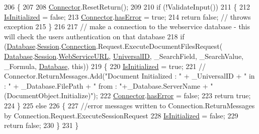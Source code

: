 \begin{DoxyCode}
206     \{
207 
208         \mbox{\hyperlink{class_connector}{Connector}}.ResetReturn();
209 
210         \textcolor{keywordflow}{if} (!ValidateInput())
211         \{
212             \mbox{\hyperlink{class_document_object_a3b2075b73f38d05091b69decc6ce7992}{IsInitialized}} = \textcolor{keyword}{false};
213             \mbox{\hyperlink{class_connector}{Connector}}.\mbox{\hyperlink{class_connector_a079bae21a5417efa53bfe8954c0f533f}{hasError}} = \textcolor{keyword}{true};
214             \textcolor{keywordflow}{return} \textcolor{keyword}{false};   \textcolor{comment}{// throws exception}
215         \}
216 
217         \textcolor{comment}{// make a connection to the webservice database - this will check the users authentication on that
       database}
218         \textcolor{keywordflow}{if} (\mbox{\hyperlink{class_document_object_a69d5338c9835f748490323d2950eed09}{Database}}.\mbox{\hyperlink{class_database_object_aa8484162b7d2a7c4c9426bca13c64c07}{Session}}.\mbox{\hyperlink{class_session_object_a014bdbf705a753540e19bfb53030c55c}{Connection}}.Request.ExecuteDocumentFilesRequest(
      \mbox{\hyperlink{class_document_object_a69d5338c9835f748490323d2950eed09}{Database}}.\mbox{\hyperlink{class_database_object_aa8484162b7d2a7c4c9426bca13c64c07}{Session}}.\mbox{\hyperlink{class_session_object_a697c071c812fbf7ad1166b896fb44c16}{WebServiceURL}}, \mbox{\hyperlink{class_document_object_a8b96d04632a2802e7cc5466ca5cee8cf}{UniversalID}}, \_SearchField, 
      \_SearchValue, \_Formula, \mbox{\hyperlink{class_document_object_a69d5338c9835f748490323d2950eed09}{Database}}, \textcolor{keyword}{this}))
219         \{
220             \mbox{\hyperlink{class_document_object_a3b2075b73f38d05091b69decc6ce7992}{IsInitialized}} = \textcolor{keyword}{true};
221             \textcolor{comment}{//  Connector.ReturnMessages.Add("Document Initialized : " + \_UniversalID + " in : " +
       \_Database.FilePath + " from : "+\_Database.ServerName + " (DocumentObject.Initialize)");}
222             \mbox{\hyperlink{class_connector}{Connector}}.\mbox{\hyperlink{class_connector_a079bae21a5417efa53bfe8954c0f533f}{hasError}} = \textcolor{keyword}{false};
223             \textcolor{keywordflow}{return} \textcolor{keyword}{true};
224         \}
225         \textcolor{keywordflow}{else}
226         \{
227             \textcolor{comment}{//error messages written to Connection.ReturnMessages by
       Connection.Request.ExecuteSessionRequest}
228             \mbox{\hyperlink{class_document_object_a3b2075b73f38d05091b69decc6ce7992}{IsInitialized}} = \textcolor{keyword}{false};
229             \textcolor{keywordflow}{return} \textcolor{keyword}{false};
230         \}
231     \}
\end{DoxyCode}



